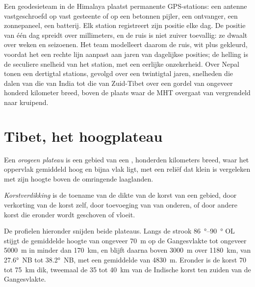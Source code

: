 \begin{inthefield}
Een geodesieteam in de Himalaya plaatst permanente GPS-stations: een antenne vastgeschroefd op vast gesteente
of op een betonnen pijler, een ontvanger, een zonnepaneel, een batterij. Elk station registreert zijn
positie elke dag. De positie van één dag spreidt over millimeters, en de ruis is niet zuiver
toevallig: ze dwaalt over weken en seizoenen. Het team modelleert daarom de ruis, wit plus
gekleurd, voordat het een rechte lijn aanpast aan jaren van dagelijkse posities; de helling is de
seculiere snelheid van het station, met een eerlijke onzekerheid. Over Nepal tonen een dertigtal stations,
gevolgd over een twintigtal jaren, snelheden die dalen van die van India tot die van Zuid-Tibet
over een gordel van ongeveer honderd kilometer breed, boven de plaats waar de MHT overgaat van vergrendeld
naar kruipend.
\end{inthefield}

\section{Tibet, het hoogplateau}\label{sec:b2:himalaya-andes:tibet}

\begin{definition}\label{def:b2:himalaya-andes:plateau}
Een \emph{orogeen plateau} is een gebied van een , honderden
kilometers breed, waar het oppervlak gemiddeld hoog en bijna vlak ligt, met een reliëf
dat klein is vergeleken met zijn hoogte boven de omringende laaglanden.
\end{definition}

\begin{definition}[Korstverdikking]\label{def:b2:himalaya-andes:thickening}
\emph{Korstverdikking} is de toename van de dikte van de
korst van een gebied, door verkorting van de korst zelf, door toevoeging van  van onderen, of door
andere korst die eronder wordt geschoven of vloeit.
\end{definition}

De profielen hieronder snijden beide plateaus. Langs de strook \qtyrange{86}{90}{\degree} OL stijgt de gemiddelde
hoogte van ongeveer \qty{70}{m} op de Gangesvlakte tot ongeveer \qty{5000}{m} in minder
dan \qty{170}{km}, en blijft daarna boven \qty{3000}{m} over \qty{1180}{km}, van \ang{27.6}~NB tot
\ang{38.2}~NB, met een gemiddelde van \qty{4830}{m}. Eronder is de korst 70 tot \qty{75}{km} dik,
tweemaal de 35 tot \qty{40}{km} van de Indische korst ten zuiden van de Gangesvlakte.

